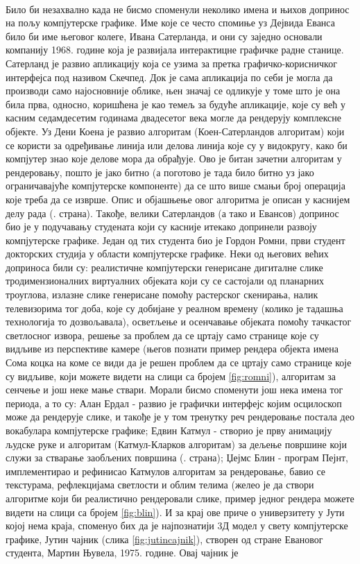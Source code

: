 \documentclass[12pt]{article}
\begin{document}
	\paragraph{}
	Било би незахвално када не бисмо споменули неколико имена и њихов допринос на пољу компјутерске графике. Име које се често спомиње уз Дејвида Еванса било би име његовог колеге, Ивана Сатерланда, и они су заједно основали компанију 1968. године која је развијала интерактицне графичке радне станице. Сатерланд је развио апликацију која се узима за претка графичко-корисничког интерфејса под називом Скечпед. Док је сама апликација по себи је могла да производи само најосновније облике, њен значај се одликује у томе што је она била прва, односно, коришћена је као темељ за будуће апликације, које су већ у касним седамдесетим годинама двадесетог века могле да рендерују комплексне објекте. Уз Дени Коена је развио алгоритам (Коен-Сатерландов алгоритам) који се користи за одређивање линија или делова линија које су у видокругу, како би компјутер знао које делове мора да обрађује. Ово је битан зачетни алгоритам у рендеровању, пошто је јако битно (а поготово је тада било битно уз јако ограничавајуће компјутерске компоненте) да се што више смањи број операција које треба да се изврше. Опис и објашњење овог алгоритма је описан у каснијем делу рада (\pageref{koensaterland}. страна). Такође, велики Сатерландов (а тако и Евансов) допринос био је у подучавању студената који су касније итекако допринели развоју компјутерске графике. Један од тих студента био је Гордон Ромни, први студент докторских студија у области компјутерске графике. Неки од његових већих доприноса били су: реалистичне компјутерски генерисане дигиталне слике тродимензионалних виртуалних објеката који су се састојали од планарних троуглова, излазне слике генерисане помоћу растерског скенирања, налик телевизорима тог доба, које су добијане у реалном времену (колико је тадашња технологија то дозвољавала), осветљење и осенчавање објеката помоћу тачкастог светлосног извора, решење за проблем да се цртају само странице које су видљиве из перспективе камере (његов познати пример рендера објекта имена Сома коцка на коме се види да је решен проблем да се цртају само странице које су видљиве, који можете видети на слици са бројем \ref{fig:romni}), алгоритам за сенчење и још неке мање ствари. Морали бисмо споменути још нека имена тог периода, а то су: Алан Ердал - развио је графички интерфејс којим осцилоскоп може да рендерује слике, и такође је у том тренутку реч рендеровање постала део вокабулара компјутерске графике; Едвин Катмул - створио је прву анимацију људске руке и алгоритам (Катмул-Кларков алгоритам) за дељење површине који служи за стварање заобљених површина (\pageref{katmulklark}. страна); Џејмс Блин - програм Пејнт, имплементирао и рефинисао Катмулов алгоритам за рендеровање, бавио се текстурама, рефлекцијама светлости и облим телима (желео је да створи алгоритме који би реалистично рендеровали слике, пример једног рендера можете видети на слици са бројем \ref{fig:blin}). И за крај ове приче о универзитету у Јути којој нема краја, споменуо бих да је најпознатији 3Д модел у свету компјутерске графике, Јутин чајник (слика \ref{fig:jutincajnik}), створен од стране Евановог студента, Мартин Њувела, 1975. године. Овај чајник је 
\end{document}
